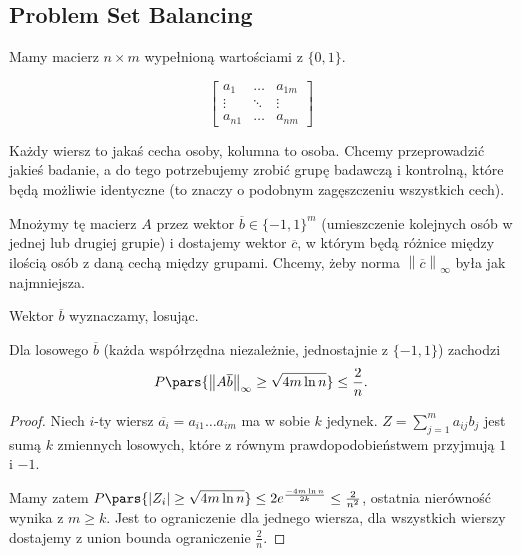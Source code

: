 \subsection{Problem Set Balancing}

Mamy macierz \(n\times m\) wypełnioną wartościami z \(\{0,1\} \).

\[ \begin{bmatrix} a_1 & \ldots & a_{1m} \\ \vdots & \ddots & \vdots \\ a_{n 1} & \ldots & a_{nm} \end{bmatrix}  \]

Każdy wiersz to jakaś cecha osoby, kolumna to osoba. Chcemy przeprowadzić jakieś badanie, a do tego potrzebujemy zrobić grupę badawczą i kontrolną, które będą możliwie identyczne (to znaczy o podobnym zagęszczeniu wszystkich cech).

Mnożymy tę macierz \(A\) przez wektor \(\overline{b} \in \{-1,1\} ^{m}\) (umieszczenie kolejnych osób w jednej lub drugiej grupie) i dostajemy wektor \(\overline{c}\), w którym będą różnice między ilością osób z daną cechą między grupami. Chcemy, żeby norma \(\left\|\overline{c}\right\|_{\infty}\) była jak najmniejsza.

Wektor \(\overline{b}\) wyznaczamy, losując.

\begin{theorem}
	Dla losowego \(\overline{b}\) (każda współrzędna niezależnie, jednostajnie z \(\{-1,1\} \)) zachodzi
	\[ P \pars{ \left\|A \overline{b}\right\|_{\infty}  \ge \sqrt{4m \ln n}  } \le \frac{2}{n}. \]
\end{theorem}
\begin{proof}
	Niech \(i\)-ty wiersz \(\overline{a_i} = a_{i 1}\ldots a_{im}\) ma w sobie \(k\) jedynek. \(Z = \sum_{j=1}^{m} a_{ij}b_j\) jest sumą \(k\) zmiennych losowych, które z równym prawdopodobieństwem przyjmują \(1\) i \(-1\).

	Mamy zatem \(P \pars{ \left|Z_i\right|\ge  \sqrt{4m \ln n}  } \le 2 e^{\frac{-4m \ln n}{2k}} \le \frac{2}{n^2}\), ostatnia nierówność wynika z \(m \ge k\). Jest to ograniczenie dla jednego wiersza, dla wszystkich wierszy dostajemy z union bounda ograniczenie \(\frac{2}{n}\).
\end{proof}

